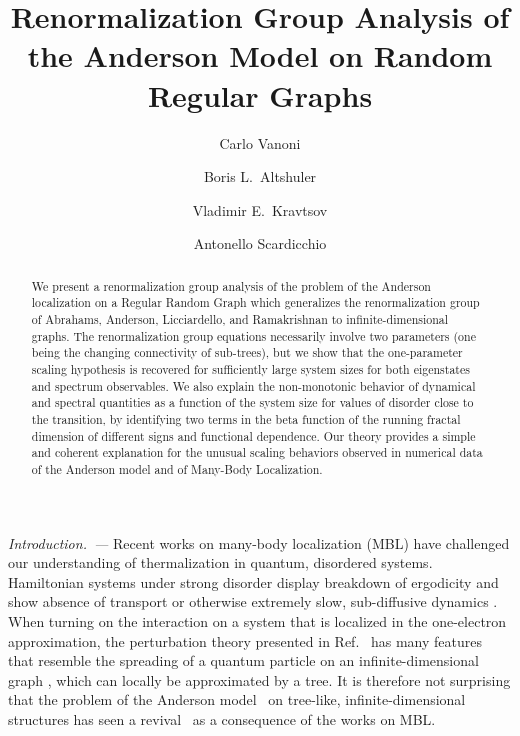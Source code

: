 \documentclass[reprint,aps,prl,superscriptaddress,english,nolongbibliography]{revtex4-2}
\begin{document}
\title{Renormalization Group Analysis of the Anderson Model on Random Regular Graphs}

\author{Carlo Vanoni}
\author{Boris L.\ Altshuler}
\author{Vladimir E.\ Kravtsov}
\author{Antonello Scardicchio}

\begin{abstract}
    We present a renormalization group analysis of the problem of the Anderson localization on a Regular Random Graph which generalizes the renormalization group of Abrahams, Anderson, Licciardello, and Ramakrishnan to infinite-dimensional graphs. The renormalization group equations necessarily involve two parameters (one being the changing connectivity of sub-trees), but we show that the one-parameter scaling hypothesis is recovered for sufficiently large system sizes for both eigenstates and spectrum observables. 
    We also explain the non-monotonic behavior of dynamical and spectral quantities as a function of the system size for values of disorder close to the transition, by identifying two terms in the beta function of the running fractal dimension of different signs and functional dependence. Our theory provides a simple and coherent explanation for the unusual scaling behaviors observed in numerical data of the Anderson model and of Many-Body Localization.
\end{abstract}

\maketitle

\emph{Introduction.~---}
Recent works on many-body localization (MBL) \cite{Basko06,Pal10,Serbyn13b,ros2015integrals,Nandkishore15,Imbrie17,Abanin2019colloquium} have challenged our understanding of thermalization in quantum, disordered systems. Hamiltonian systems under strong disorder display breakdown of ergodicity and show absence of transport or otherwise extremely slow, sub-diffusive dynamics \cite{vznidarivc2016diffusive}. When turning on the interaction on a system that is localized in the one-electron approximation, the perturbation theory presented in Ref.~\cite{Basko06} has many features that resemble the spreading of a quantum particle on an infinite-dimensional graph \cite{altshuler1997quasiparticle}, which can locally be approximated by a tree. It is therefore not surprising that the problem of the Anderson model~\cite{Anderson1958absence} on tree-like, infinite-dimensional structures has seen a revival~\cite{de2014anderson,parisi2019anderson,biroli2017delocalized,tikhonov2021AndersonMBL,Lemariè2022critical,baroni2023corrections,Mata2017Scaling,Mata2020two,tikhonov2016fractality,arenz2023wegner,Altshuler2016Nonergodic,zirnbauer2023wegner} as a consequence of the works on MBL.
\end{document}
